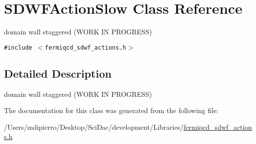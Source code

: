 \hypertarget{class_s_d_w_f_action_slow}{
\section{SDWFActionSlow Class Reference}
\label{class_s_d_w_f_action_slow}
}
domain wall staggered (WORK IN PROGRESS)  


{\tt \#include $<$fermiqcd\_\-sdwf\_\-actions.h$>$}



\subsection{Detailed Description}
domain wall staggered (WORK IN PROGRESS) 

The documentation for this class was generated from the following file:\begin{CompactItemize}
\item 
/Users/mdipierro/Desktop/SciDac/development/Libraries/\hyperlink{fermiqcd__sdwf__actions_8h}{fermiqcd\_\-sdwf\_\-actions.h}\end{CompactItemize}
